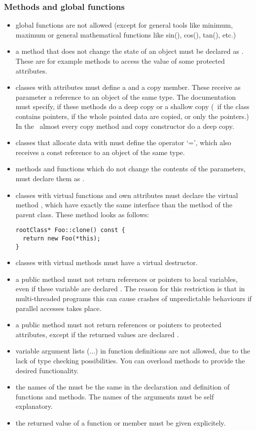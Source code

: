 \subsubsection{Methods and global functions}
\begin{itemize}
\item global functions are not allowed (except for general tools like minimum,
  maximum or general mathematical functions like sin(), cos(), tan(), etc.)
\item a method that does not change the state of an object must be declared as
  .  These are for example methods to access the value of some
  protected attributes.
\item classes with attributes must define a  and a
  copy member.  These receive as parameter a  reference
  to an object of the same type.  The documentation must specify, if these
  methods do a deep copy or a shallow copy (\ie\ if the class contains
  pointers, if the whole pointed data are copied, or only the pointers.)
  In the \ltilib\ almost every copy method and copy constructor do
  a deep copy.
\item classes that allocate data with  must define the operator `=',
  which also receives a const reference to an object of the same type.
\item methods and functions which do not change the contents of the
  parameters, must declare them as .
\item classes with virtual functions and own attributes must declare the
  virtual method , which have exactly the same interface than
  the  method of the parent class.  These method looks as
  follows:
\begin{verbatim}
rootClass* Foo::clone() const {
  return new Foo(*this);
}
\end{verbatim}
\item classes with virtual methods must have a virtual destructor.
\item a public method must not return references or pointers to local
  variables, even if these variable are declared .  The reason
  for this restriction is that in multi-threaded programs this can cause
  crashes of unpredictable behaviours if parallel accesses takes place.
\item a public method must not return references or pointers to protected
  attributes, except if the returned values are declared .
\item variable argument lists (...) in function definitions are not allowed,
  due to the lack of type checking possibilities.  You can overload methods
  to provide the desired functionality.
\item the names of the  must be the same in the declaration
  and definition of functions and methods.  The names of the arguments must
  be self explanatory.
\item the returned value of a function or member must be given explicitely.
\end{itemize}

